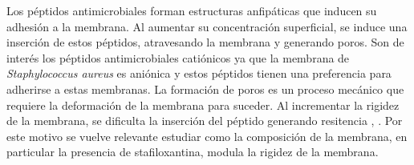 Los p\'{e}ptidos antimicrobiales forman estructuras anfip\'{a}ticas que inducen su adhesi\'{o}n a la membrana. Al aumentar su concentraci\'{o}n superficial, se induce una inserci\'{o}n de estos p\'{e}ptidos, atravesando la membrana y generando poros. Son de inter\'{e}s los p\'{e}ptidos antimicrobiales cati\'{o}nicos ya que la membrana de \textit{Staphylococcus aureus} es ani\'{o}nica y estos p\'{e}ptidos tienen una preferencia para adherirse a estas membranas. La formaci\'{o}n de poros es un proceso mec\'{a}nico que requiere la deformaci\'{o}n de la membrana para suceder. Al incrementar la rigidez de la membrana, se dificulta la inserci\'{o}n del p\'{e}ptido generando resitencia \cite{Perez-Lopez2019VariationsProperties}, \cite{Nagendra2011}. Por este motivo se vuelve relevante estudiar como la composici\'{o}n de la membrana, en particular la presencia de stafiloxantina, modula la rigidez de la membrana.
